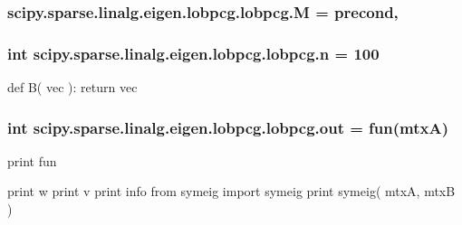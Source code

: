 \subsubsection[{M}]{\setlength{\rightskip}{0pt plus 5cm}scipy.\+sparse.\+linalg.\+eigen.\+lobpcg.\+lobpcg.\+M = {\bf precond},}\label{namespacescipy_1_1sparse_1_1linalg_1_1eigen_1_1lobpcg_1_1lobpcg_aa4151c097daf543ab6da855db2ab8c72}
\hypertarget{namespacescipy_1_1sparse_1_1linalg_1_1eigen_1_1lobpcg_1_1lobpcg_ae795230f2ed4598923ccdeaa311f303c}{}
\subsubsection[{n}]{\setlength{\rightskip}{0pt plus 5cm}int scipy.\+sparse.\+linalg.\+eigen.\+lobpcg.\+lobpcg.\+n = 100}\label{namespacescipy_1_1sparse_1_1linalg_1_1eigen_1_1lobpcg_1_1lobpcg_ae795230f2ed4598923ccdeaa311f303c}


def B( vec )\+: return vec 

\hypertarget{namespacescipy_1_1sparse_1_1linalg_1_1eigen_1_1lobpcg_1_1lobpcg_a49c3c9d868a61c99986e60bdfbdb6772}{}
\subsubsection[{out}]{\setlength{\rightskip}{0pt plus 5cm}int scipy.\+sparse.\+linalg.\+eigen.\+lobpcg.\+lobpcg.\+out = fun(mtx\+A)}\label{namespacescipy_1_1sparse_1_1linalg_1_1eigen_1_1lobpcg_1_1lobpcg_a49c3c9d868a61c99986e60bdfbdb6772}


print fun 

print w print v print info from symeig import symeig print symeig( mtx\+A, mtx\+B ) \hypertarget{namespacescipy_1_1sparse_1_1linalg_1_1eigen_1_1lobpcg_1_1lobpcg_ae9bf54322e073125cfc164421e46e06f}{}
